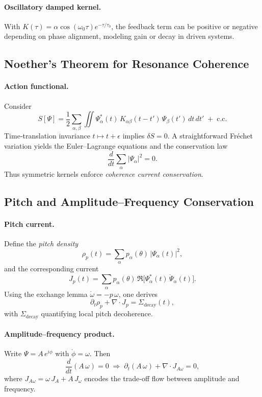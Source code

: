 \paragraph{Oscillatory damped kernel.}  
With \(K(\tau)=\alpha\cos(\omega_{0}\tau)e^{-\tau/\tau_{0}}\), the feedback term can be positive or negative depending on phase alignment, modeling gain or decay in driven systems.

\subsection{Noether’s Theorem for Resonance Coherence}

\paragraph{Action functional.}  
Consider
\[
  S[\Psi]
  = \frac12
    \sum_{\alpha,\beta}
    \iint
      \Psi_{\alpha}^{*}(t)\,K_{\alpha\beta}(t-t')\,\Psi_{\beta}(t')
    \,dt\,dt'
  \;+\;\mathrm{c.c.}
\]
Time‐translation invariance \(t\mapsto t+\epsilon\) implies \(\delta S=0\).  A straightforward Fréchet variation yields the Euler–Lagrange equations and the conservation law
\[
  \frac{d}{dt}\sum_{\alpha}|\Psi_{\alpha}|^{2}=0.
\]
Thus symmetric kernels enforce \emph{coherence current conservation}.

\subsection{Pitch and Amplitude–Frequency Conservation}

\paragraph{Pitch current.}  
Define the \emph{pitch density}
\[
  \rho_{p}(t)
  = \sum_{\alpha}
    p_{\alpha}(\theta)\,\bigl|\Psi_{\alpha}(t)\bigr|^{2},
\]
and the corresponding current
\[
  J_{p}(t)
  = \sum_{\alpha}
    p_{\alpha}(\theta)\,
    \Re\bigl[\Psi_{\alpha}^{*}(t)\,\dot\Psi_{\alpha}(t)\bigr].
\]
Using the exchange lemma \(\dot\omega=-p\,\omega\), one derives
\[
  \partial_{t}\rho_{p}
  + \nabla\!\cdot J_{p}
  = \Sigma_{\mathrm{decay}}(t),
\]
with \(\Sigma_{\mathrm{decay}}\) quantifying local pitch decoherence.

\paragraph{Amplitude–frequency product.}  
Write \(\Psi=A\,e^{i\phi}\) with \(\dot\phi=\omega\).  Then
\[
  \frac{d}{dt}(A\,\omega)=0
  \;\Longrightarrow\;
  \partial_{t}(A\,\omega)
  + \nabla\!\cdot J_{A\omega}
  = 0,
\]
where \(J_{A\omega} = \omega\,J_{A} + A\,J_{\omega}\) encodes the trade‐off flow between amplitude and frequency.

